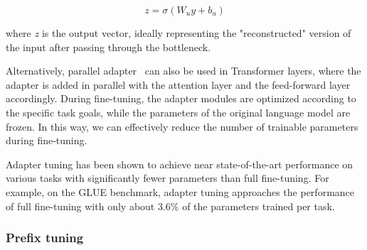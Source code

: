 \begin{equation}
	z = \sigma (W_{u}y + b_u)
	\label{eq:adapter-expansion}
\end{equation}

\noindent where \textit{z} is the output vector, ideally representing the "reconstructed" version of the input after passing through the bottleneck.

Alternatively, parallel adapter~\cite{he2022unified} can also be used in Transformer layers, where the adapter is added in parallel with the attention layer and the feed-forward layer accordingly.
During fine-tuning, the adapter modules are optimized according to the specific task goals, while the parameters of the original language model are frozen.
In this way, we can effectively reduce the number of trainable parameters during fine-tuning.

Adapter tuning has been shown to achieve near state-of-the-art performance on various tasks with significantly fewer parameters than full fine-tuning.
For example, on the GLUE benchmark, adapter tuning approaches the performance of full fine-tuning with only about 3.6\% of the parameters trained per task.

\subsubsection{Prefix tuning}
\label{subsubsec:prefix-tuning}

